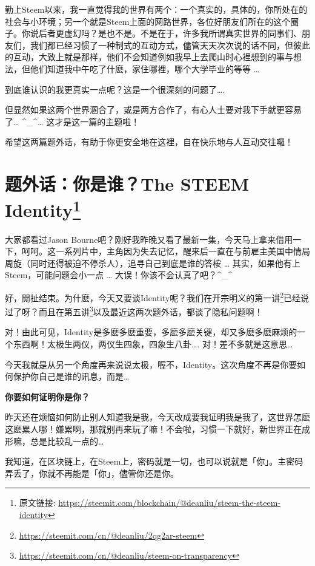 \documentclass[]{ctexbook}
\renewcommand{\href}[2]{#2\footnote{\url{#1}}}
\begin{document}
勤上Steem以来，我一直觉得我的世界有两个：一个真实的，具体的，你所处在的社会与小环境；另一个就是Steem上面的网路世界，各位好朋友们所在的这个圈子。你说后者更虚幻吗？是也不是。不是在于，许多我所谓真实世界的同事们、朋友们，我们都已经习惯了一种制式的互动方式，儘管天天次次说的话不同，但彼此的互动，大致上就是那样，他们不会知道例如我早上去爬山时心裡想到的事与想法，但他们知道我中午吃了什麽，家住哪裡，哪个大学毕业的等等 \ldots{}

到底谁认识的我更真实一点呢？这是一个很深刻的问题了\ldots{}.

但显然如果这两个世界溷合了，或是两方合作了，有心人士要对我下手就更容易了\ldots{} \^{}\_\^{}\ldots{} 这才是这一篇的主题啦！

希望这两篇题外话，有助于你更安全地在这裡，自在快乐地与人互动交往囉！

\hypertarget{the-steem-identity}{%
\section[题外话：你是谁？The STEEM Identity]{\texorpdfstring{题外话：你是谁？The STEEM Identity\footnote{原文链接: \url{https://steemit.com/blockchain/@deanliu/steem-the-steem-identity}}}{题外话：你是谁？The STEEM Identity}}\label{the-steem-identity}}

大家都看过Jason Bourne吧？刚好我昨晚又看了最新一集，今天马上拿来借用一下，呵呵。这一系列片中，主角因为失去记忆，醒来后一直在与前雇主美国中情局周旋（同时还得被迫不停杀人），追寻自己到底是谁的答桉 \ldots{} 其实，如果他有上Steem，可能问题会小一点 \ldots{} 大误！你该不会认真了吧？\^{}\_\^{}

好，閒扯结束。为什麽，今天又要谈Identity呢？我们在开宗明义的\href{https://steemit.com/cn/@deanliu/2qg2ar-steem}{第一讲}已经说过了呀？而且在\href{https://steemit.com/cn/@deanliu/steem-on-transparency}{第五讲}以及最近这两次题外话，都谈了隐私问题啊！

对！由此可见，Identity是多麽多麽重要，多麽多麽关键，却又多麽多麽麻烦的一个东西啊！太极生两仪，两仪生四象，四象生八卦\ldots{}. 对！差不多就是这意思\ldots{}

今天我就是从另一个角度再来说说太极，喔不，Identity。这次角度不再是你要如何保护你自己是谁的讯息，而是\ldots{}

\textbf{你要如何证明你是你？}

昨天还在烦恼如何防止别人知道我是我，今天改成要我证明我是我了，这世界怎麽这麽累人哪！嫌累啊，那就别再来玩了嘛！不会啦，习惯一下就好，新世界正在成形嘛，总是比较乱一点的\ldots{}

我知道，在区块链上，在Steem上，密码就是一切，也可以说就是「你」。主密码弄丢了，你就不再能是「你」，儘管你还是你。
\end{document}
